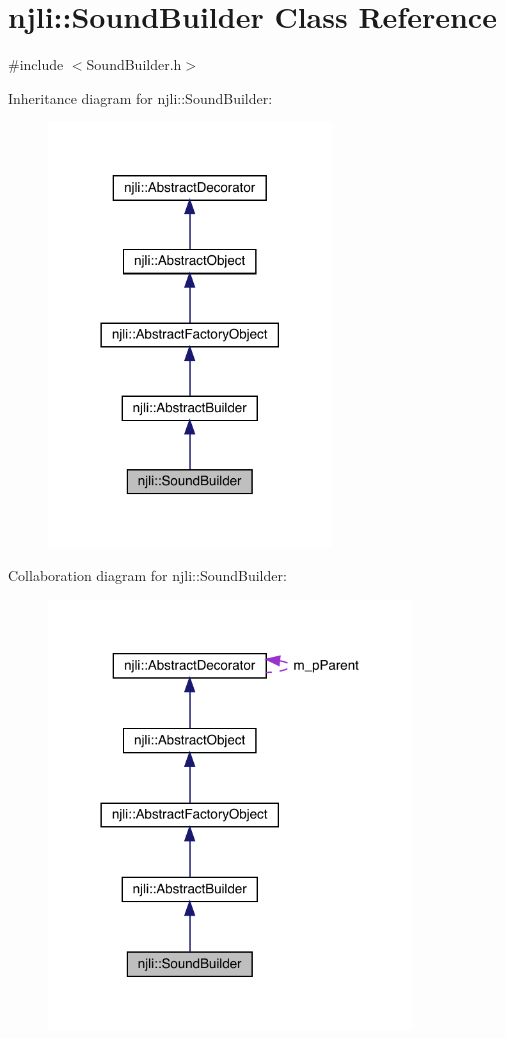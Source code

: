 \hypertarget{classnjli_1_1_sound_builder}{}\section{njli\+:\+:Sound\+Builder Class Reference}
\label{classnjli_1_1_sound_builder}


{\ttfamily \#include $<$Sound\+Builder.\+h$>$}



Inheritance diagram for njli\+:\+:Sound\+Builder\+:\nopagebreak
\begin{figure}[H]
\begin{center}
\leavevmode
\includegraphics[width=213pt]{classnjli_1_1_sound_builder__inherit__graph}
\end{center}
\end{figure}


Collaboration diagram for njli\+:\+:Sound\+Builder\+:\nopagebreak
\begin{figure}[H]
\begin{center}
\leavevmode
\includegraphics[width=273pt]{classnjli_1_1_sound_builder__coll__graph}
\end{center}
\end{figure}
